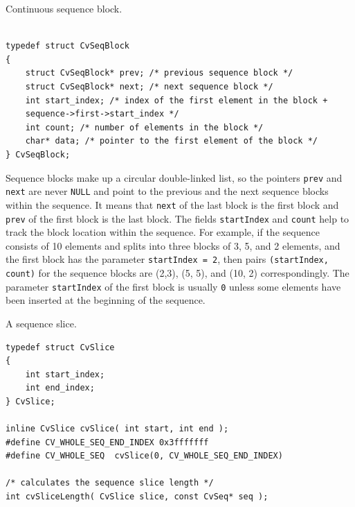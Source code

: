 \label{CvSeqBlock}

Continuous sequence block.

\begin{lstlisting}

typedef struct CvSeqBlock
{
    struct CvSeqBlock* prev; /* previous sequence block */
    struct CvSeqBlock* next; /* next sequence block */
    int start_index; /* index of the first element in the block +
    sequence->first->start_index */
    int count; /* number of elements in the block */
    char* data; /* pointer to the first element of the block */
} CvSeqBlock;

\end{lstlisting}

Sequence blocks make up a circular double-linked list, so the pointers
\texttt{prev} and \texttt{next} are never \texttt{NULL} and point to the
previous and the next sequence blocks within the sequence. It means that
\texttt{next} of the last block is the first block and \texttt{prev} of
the first block is the last block. The fields \texttt{startIndex} and
\texttt{count} help to track the block location within the sequence. For
example, if the sequence consists of 10 elements and splits into three
blocks of 3, 5, and 2 elements, and the first block has the parameter
\texttt{startIndex = 2}, then pairs \texttt{(startIndex, count)} for the sequence
blocks are
(2,3), (5, 5), and (10, 2)
correspondingly. The parameter
\texttt{startIndex} of the first block is usually \texttt{0} unless
some elements have been inserted at the beginning of the sequence.

\label{CvSlice}
A sequence slice.

\begin{lstlisting}
typedef struct CvSlice
{
    int start_index;
    int end_index;
} CvSlice;

inline CvSlice cvSlice( int start, int end );
#define CV_WHOLE_SEQ_END_INDEX 0x3fffffff
#define CV_WHOLE_SEQ  cvSlice(0, CV_WHOLE_SEQ_END_INDEX)

/* calculates the sequence slice length */
int cvSliceLength( CvSlice slice, const CvSeq* seq );
\end{lstlisting}

